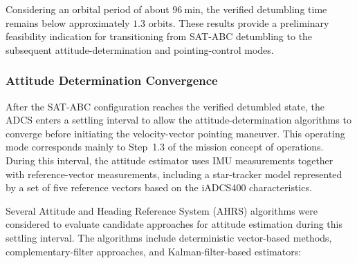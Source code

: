 Considering an orbital period of about \(96~\mathrm{min}\), the verified detumbling time remains below approximately \(1.3\) orbits. These results provide a preliminary feasibility indication for transitioning from SAT-ABC detumbling to the subsequent attitude-determination and pointing-control modes.

\subsubsection{Attitude Determination Convergence}
\label{subsub:adcs_satabc_attitude_determination}

After the SAT-ABC configuration reaches the verified detumbled state, the ADCS enters a settling interval to allow the attitude-determination algorithms to converge before initiating the velocity-vector pointing maneuver. This operating mode corresponds mainly to Step~1.3 of the mission concept of operations. During this interval, the attitude estimator uses IMU measurements together with reference-vector measurements, including a star-tracker model represented by a set of five reference vectors based on the iADCS400 characteristics.

Several Attitude and Heading Reference System (AHRS) algorithms were considered to evaluate candidate approaches for attitude estimation during this settling interval. The algorithms include deterministic vector-based methods, complementary-filter approaches, and Kalman-filter-based estimators:

